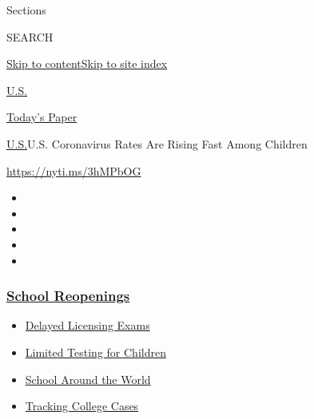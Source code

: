 Sections

SEARCH

\protect\hyperlink{site-content}{Skip to
content}\protect\hyperlink{site-index}{Skip to site index}

\href{https://www.nytimes3xbfgragh.onion/section/us}{U.S.}

\href{https://myaccount.nytimes3xbfgragh.onion/auth/login?response_type=cookie\&client_id=vi}{}

\href{https://www.nytimes3xbfgragh.onion/section/todayspaper}{Today's
Paper}

\href{/section/us}{U.S.}\textbar{}U.S. Coronavirus Rates Are Rising Fast
Among Children

\url{https://nyti.ms/3hMPbOG}

\begin{itemize}
\item
\item
\item
\item
\item
\end{itemize}

\hypertarget{school-reopenings}{%
\subsubsection{\texorpdfstring{\href{https://www.nytimes3xbfgragh.onion/spotlight/schools-reopening?name=styln-coronavirus-schools-reopening\&region=TOP_BANNER\&block=storyline_menu_recirc\&action=click\&pgtype=Interactive\&impression_id=d26638d0-f1e9-11ea-90a7-1f8163516127\&variant=undefined}{School
Reopenings}}{School Reopenings}}\label{school-reopenings}}

\begin{itemize}
\tightlist
\item
  \href{https://www.nytimes3xbfgragh.onion/2020/09/04/us/bar-exam-coronavirus.html?name=styln-coronavirus-schools-reopening\&region=TOP_BANNER\&block=storyline_menu_recirc\&action=click\&pgtype=Interactive\&impression_id=d26638d1-f1e9-11ea-90a7-1f8163516127\&variant=undefined}{Delayed
  Licensing Exams}
\item
  \href{https://www.nytimes3xbfgragh.onion/2020/09/08/upshot/children-testing-shortfalls-virus.html?name=styln-coronavirus-schools-reopening\&region=TOP_BANNER\&block=storyline_menu_recirc\&action=click\&pgtype=Interactive\&impression_id=d26638d2-f1e9-11ea-90a7-1f8163516127\&variant=undefined}{Limited
  Testing for Children}
\item
  \href{https://www.nytimes3xbfgragh.onion/2020/09/01/world/schools-reopen-globe-students.html?name=styln-coronavirus-schools-reopening\&region=TOP_BANNER\&block=storyline_menu_recirc\&action=click\&pgtype=Interactive\&impression_id=d26638d3-f1e9-11ea-90a7-1f8163516127\&variant=undefined}{School
  Around the World}
\item
  \href{https://www.nytimes3xbfgragh.onion/interactive/2020/us/covid-college-cases-tracker.html?name=styln-coronavirus-schools-reopening\&region=TOP_BANNER\&block=storyline_menu_recirc\&action=click\&pgtype=Interactive\&impression_id=d26638d4-f1e9-11ea-90a7-1f8163516127\&variant=undefined}{Tracking
  College Cases}
\end{itemize}

